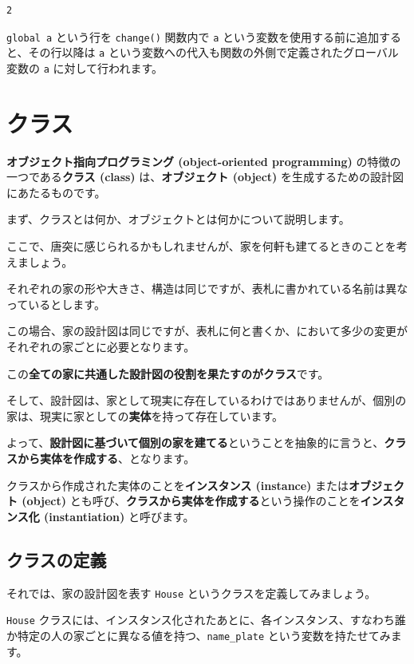 \begin{lstlisting}[style=outputcell]
2
\end{lstlisting}

\texttt{global a} という行を \texttt{change()} 関数内で \texttt{a} という変数を使用する前に追加すると、その行以降は \texttt{a} という変数への代入も関数の外側で定義されたグローバル変数の \texttt{a} に対して行われます。


\section{クラス}


\textbf{オブジェクト指向プログラミング (object-oriented programming)} の特徴の一つである\textbf{クラス (class)} は、\textbf{オブジェクト (object)} を生成するための設計図にあたるものです。

まず、クラスとは何か、オブジェクトとは何かについて説明します。


ここで、唐突に感じられるかもしれませんが、家を何軒も建てるときのことを考えましょう。

それぞれの家の形や大きさ、構造は同じですが、表札に書かれている名前は異なっているとします。

この場合、家の設計図は同じですが、表札に何と書くか、において多少の変更がそれぞれの家ごとに必要となります。

この\textbf{全ての家に共通した設計図の役割を果たすのがクラス}です。

そして、設計図は、家として現実に存在しているわけではありませんが、個別の家は、現実に家としての\textbf{実体}を持って存在しています。

よって、\textbf{設計図に基づいて個別の家を建てる}ということを抽象的に言うと、\textbf{クラスから実体を作成する}、となります。

クラスから作成された実体のことを\textbf{インスタンス (instance)} または\textbf{オブジェクト (object)} とも呼び、\textbf{クラスから実体を作成する}という操作のことを\textbf{インスタンス化 (instantiation)} と呼びます。


\subsection{クラスの定義}


それでは、家の設計図を表す \texttt{House} というクラスを定義してみましょう。

\texttt{House} クラスには、インスタンス化されたあとに、各インスタンス、すなわち誰か特定の人の家ごとに異なる値を持つ、\texttt{name\_plate} という変数を持たせてみます。


